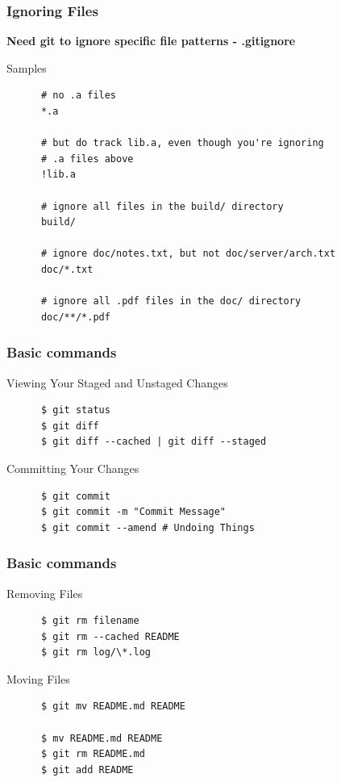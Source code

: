 \documentclass[10pt]{beamer}
\begin{document}
\begin{frame}[fragile]
  \frametitle{Ignoring Files}
  \textbf{Need git to ignore specific file patterns - .gitignore}
  \medskip
  \begin{block}{Samples}
    \begin{verbatim}
      # no .a files
      *.a

      # but do track lib.a, even though you're ignoring
      # .a files above
      !lib.a

      # ignore all files in the build/ directory
      build/

      # ignore doc/notes.txt, but not doc/server/arch.txt
      doc/*.txt

      # ignore all .pdf files in the doc/ directory
      doc/**/*.pdf
    \end{verbatim}
  \end{block}
  \medskip
\end{frame}

\begin{frame}[fragile]
  \frametitle{Basic commands}
  \begin{block}{Viewing Your Staged and Unstaged Changes}
    \begin{verbatim}
      $ git status
      $ git diff
      $ git diff --cached | git diff --staged
    \end{verbatim}
  \end{block}
  \pause
  \begin{block}{Committing Your Changes}
    \begin{verbatim}
      $ git commit
      $ git commit -m "Commit Message"
      $ git commit --amend # Undoing Things
    \end{verbatim}
  \end{block}
\end{frame}

\begin{frame}[fragile]
  \frametitle{Basic commands}
  \begin{block}{Removing Files}
    \begin{verbatim}
      $ git rm filename
      $ git rm --cached README
      $ git rm log/\*.log
    \end{verbatim}
  \end{block}
  \pause
  \begin{block}{Moving Files}
    \begin{verbatim}
      $ git mv README.md README

      $ mv README.md README
      $ git rm README.md
      $ git add README
    \end{verbatim}
  \end{block}
\end{frame}
\end{document}

